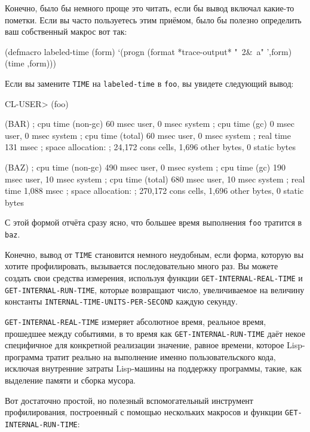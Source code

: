 Конечно, было бы немного проще это читать, если бы вывод включал какие-то пометки. Если вы
часто пользуетесь этим приёмом, было бы полезно определить ваш собственный макрос вот так:

\begin{myverb}
(defmacro labeled-time (form)
  `(progn
    (format *trace-output* "~2&~a" ',form)
    (time ,form)))
\end{myverb}

Если вы замените \lstinline{TIME} на \lstinline{labeled-time} в \lstinline{foo}, вы увидете следующий
вывод:

\begin{myverb}
CL-USER> (foo)

(BAR)
; cpu time (non-gc) 60 msec user, 0 msec system
; cpu time (gc)     0 msec user, 0 msec system
; cpu time (total)  60 msec user, 0 msec system
; real time  131 msec
; space allocation:
;  24,172 cons cells, 1,696 other bytes, 0 static bytes

(BAZ)
; cpu time (non-gc) 490 msec user, 0 msec system
; cpu time (gc)     190 msec user, 10 msec system
; cpu time (total)  680 msec user, 10 msec system
; real time  1,088 msec
; space allocation:
;  270,172 cons cells, 1,696 other bytes, 0 static bytes
\end{myverb}

С этой формой отчёта сразу ясно, что большее время выполнения \lstinline{foo} тратится в
\lstinline{baz}.

Конечно, вывод от \lstinline{TIME} становится немного неудобным, если форма, которую вы хотите
профилировать, вызывается последовательно много раз. Вы можете создать свои средства
измерения, используя функции \lstinline{GET-INTERNAL-REAL-TIME} и \lstinline{GET-INTERNAL-RUN-TIME},
которые возвращают число, увеличиваемое на величину константы
\lstinline{INTERNAL-TIME-UNITS-PER-SECOND} каждую секунду.

\lstinline{GET-INTERNAL-REAL-TIME} измеряет абсолютное время, реальное время, прошедшее между
событиями, в то время как \lstinline{GET-INTERNAL-RUN-TIME} даёт некое специфичное для
конкретной реализации значение, равное времени, которое Lisp-программа тратит реально на
выполнение именно пользовательского кода, исключая внутренние затраты Lisp-машины на
поддержку программы, такие, как выделение памяти и сборка мусора.

Вот достаточно простой, но полезный вспомогательный инструмент профилирования, построенный
с помощью нескольких макросов и функции \lstinline{GET-INTERNAL-RUN-TIME}:

